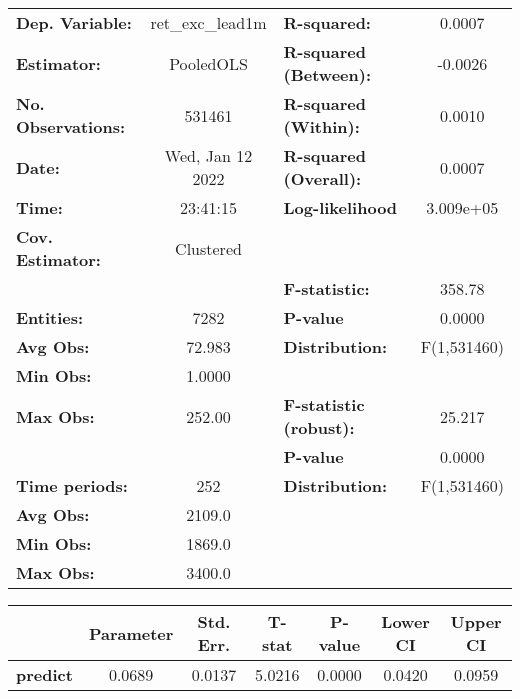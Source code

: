 \begin{center}
\begin{tabular}{lclc}
\toprule
\textbf{Dep. Variable:}    &  ret\_exc\_lead1m  & \textbf{  R-squared:         }   &      0.0007      \\
\textbf{Estimator:}        &     PooledOLS      & \textbf{  R-squared (Between):}  &     -0.0026      \\
\textbf{No. Observations:} &       531461       & \textbf{  R-squared (Within):}   &      0.0010      \\
\textbf{Date:}             &  Wed, Jan 12 2022  & \textbf{  R-squared (Overall):}  &      0.0007      \\
\textbf{Time:}             &      23:41:15      & \textbf{  Log-likelihood     }   &    3.009e+05     \\
\textbf{Cov. Estimator:}   &     Clustered      & \textbf{                     }   &                  \\
\textbf{}                  &                    & \textbf{  F-statistic:       }   &      358.78      \\
\textbf{Entities:}         &        7282        & \textbf{  P-value            }   &      0.0000      \\
\textbf{Avg Obs:}          &       72.983       & \textbf{  Distribution:      }   &   F(1,531460)    \\
\textbf{Min Obs:}          &       1.0000       & \textbf{                     }   &                  \\
\textbf{Max Obs:}          &       252.00       & \textbf{  F-statistic (robust):} &      25.217      \\
\textbf{}                  &                    & \textbf{  P-value            }   &      0.0000      \\
\textbf{Time periods:}     &        252         & \textbf{  Distribution:      }   &   F(1,531460)    \\
\textbf{Avg Obs:}          &       2109.0       & \textbf{                     }   &                  \\
\textbf{Min Obs:}          &       1869.0       & \textbf{                     }   &                  \\
\textbf{Max Obs:}          &       3400.0       & \textbf{                     }   &                  \\
\bottomrule
\end{tabular}
\begin{tabular}{lcccccc}
                 & \textbf{Parameter} & \textbf{Std. Err.} & \textbf{T-stat} & \textbf{P-value} & \textbf{Lower CI} & \textbf{Upper CI}  \\
\midrule
\textbf{predict} &       0.0689       &       0.0137       &      5.0216     &      0.0000      &       0.0420      &       0.0959       \\
\bottomrule
\end{tabular}
\end{center}
